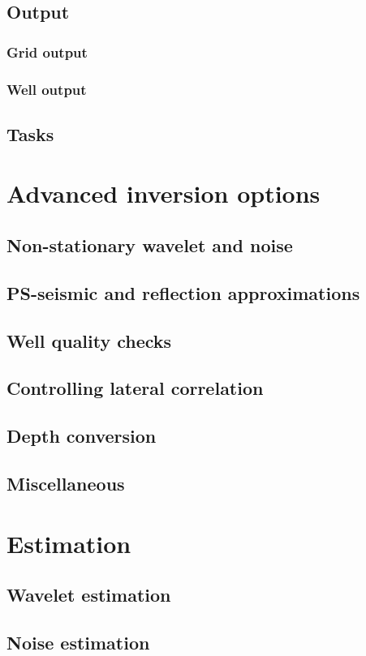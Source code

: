 \subsection{Output}
\subsubsection{Grid output}
\subsubsection{Well output}
\subsection{Tasks}
\section{Advanced inversion options}
\subsection{Non-stationary wavelet and noise}
\subsection{PS-seismic and reflection approximations}
\subsection{Well quality checks}
\subsection{Controlling lateral correlation}
\subsection{Depth conversion}
\subsection{Miscellaneous}
\section{Estimation}
\subsection{Wavelet estimation}
\subsection{Noise estimation}
